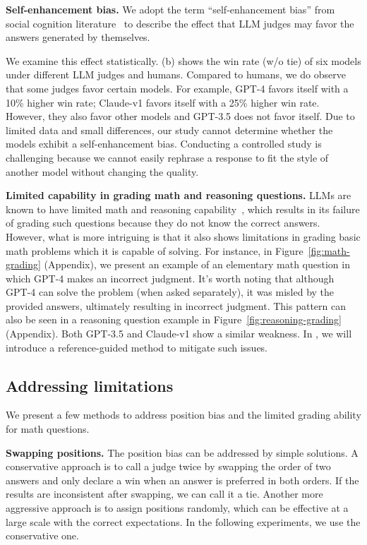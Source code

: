 \textbf{Self-enhancement bias.}
We adopt the term ``self-enhancement bias'' from social cognition literature~\cite{brown1986evaluations} to describe the effect that LLM judges may favor the answers generated by themselves.

We examine this effect statistically. (b) shows the win rate (w/o tie) of six models under different LLM judges and humans.
Compared to humans, we do observe that some judges favor certain models. For example, GPT-4 favors itself with a 10\% higher win rate; Claude-v1 favors itself with a 25\% higher win rate. However, they also favor other models and GPT-3.5 does not favor itself.
Due to limited data and small differences, our study cannot determine whether the models exhibit a self-enhancement bias.
Conducting a controlled study is challenging because we cannot easily rephrase a response to fit the style of another model without changing the quality.


\textbf{Limited capability in grading math and reasoning questions.}
LLMs are known to have limited math and reasoning capability~\cite{cobbe2021training}, which results in its failure of grading such questions because they do not know the correct answers.
However, what is more intriguing is that it also shows limitations in grading basic math problems which it is capable of solving.
For instance, in Figure~\ref{fig:math-grading} (Appendix), we present an example of an elementary math question in which GPT-4 makes an incorrect judgment.
It's worth noting that although GPT-4 can solve the problem (when asked separately), it was misled by the provided answers, ultimately resulting in incorrect judgment.
This pattern can also be seen in a reasoning question example in Figure~\ref{fig:reasoning-grading} (Appendix).
Both GPT-3.5 and Claude-v1 show a similar weakness.
In , we will introduce a reference-guided method to mitigate such issues.

\subsection{Addressing limitations}
\label{sec:addressing_limitations}
We present a few methods to address position bias and the limited grading ability for math questions.


\textbf{Swapping positions.}
The position bias can be addressed by simple solutions.
A conservative approach is to call a judge twice by swapping the order of two answers and only declare a win when an answer is preferred in both orders. If the results are inconsistent after swapping, we can call it a tie.
Another more aggressive approach is to assign positions randomly, which can be effective at a large scale with the correct expectations. In the following experiments, we use the conservative one.


